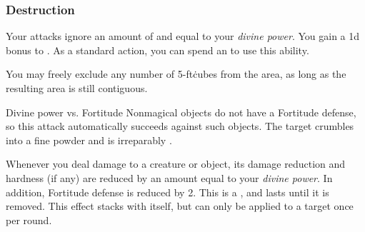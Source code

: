         \subsubsection{Destruction}
             Your attacks ignore an amount of  and  equal to your \textit{divine power}.
             You gain a \plus1d bonus to .
             As a standard action, you can spend an  to use this ability.
            \begin{ability}
                \begin{spelltargetinginfo}
                    \spellspecial You may freely exclude any number of 5-ft\. cubes from the area, as long as the resulting area is still contiguous.
                \end{spelltargetinginfo}
                \begin{spelleffects}
                    \begin{spellattack}{Divine power vs. Fortitude}
                        \spellspecial Nonmagical objects do not have a Fortitude defense, so this attack automatically succeeds against such objects.
                        \spellsuccess The target crumbles into a fine powder and is irreparably .
                    \end{spellattack}
                \end{spelleffects}
            \end{ability}
             Whenever you deal damage to a creature or object, its damage reduction and hardness (if any) are reduced by an amount equal to your \textit{divine power}.
            In addition, Fortitude defense is reduced by 2.
            This is a , and lasts until it is removed.
            This effect stacks with itself, but can only be applied to a target once per round.

